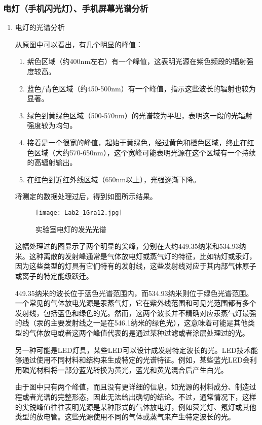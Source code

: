 \documentclass[dvipsnames, svgnames,a4paper,11pt]{article}
\begin{document}
	\subsubsection{电灯（手机闪光灯）、手机屏幕光谱分析}
	\begin{enumerate}
		\item 电灯的光谱分析
		
		从原图中可以看出，有几个明显的峰值：
		
		\begin{enumerate}
			\item 紫色区域（约400nm左右）有一个峰值，这表明光源在紫色频段的辐射强度较高。
			\item 蓝色/青色区域（约450-500nm）有一个峰值，指示这些波长的辐射也较为显著。
			\item 绿色到黄绿色区域（500-570nm）的光谱较为平坦，表明这一段的光辐射强度较为均匀。
			\item 接着是一个很宽的峰值，起始于黄绿色，经过黄色和橙色区域，终止在红色区域（大约570-650nm），这个宽峰可能表明光源在这个区域有一个持续的高辐射输出。
			\item 在红色到近红外线区域（650nm以上），光强逐渐下降。
		\end{enumerate}
		
		将测定的数据处理过后，得到如图所示结果。
		
		\begin{figure}[htbp]
			\centering
			\texttt{[image: Lab2\_1Gra12.jpg]}
			\caption{实验室电灯的发光光谱}
			\label{fig:fig12}
		\end{figure}
		
		这幅处理过的图显示了两个明显的尖峰，分别在大约449.35纳米和534.93纳米。这种离散的发射峰通常是气体放电灯或蒸气灯的特征，比如钠灯或汞灯，因为这些类型的灯具有它们特有的发射线，这些发射线对应于其内部气体原子或离子的特定能级跃迁。
		
		449.35纳米的波长位于蓝色光谱范围内，而534.93纳米则位于绿色光谱范围。一个常见的气体放电光源是汞蒸气灯，它在紫外线范围和可见光范围都有多个发射线，包括蓝色和绿色的光。然而，这两个波长并不精确对应汞蒸气灯最强的线（汞的主要发射线之一是在546.1纳米的绿色光），这意味着可能是其他类型的气体放电或者这两个峰值代表的是通过某种过滤或者涂层处理过的光。
		
		另一种可能是LED灯具，某些LED可以设计成发射特定波长的光。LED技术能够通过使用不同材料和结构来生成特定的光谱特征。例如，某些蓝光LED会利用磷光材料将一部分蓝光转换为黄光，蓝光和黄光混合后产生白光。
		
		由于图中只有两个峰值，而且没有更详细的信息，如光源的材料成分、制造过程或者光谱的完整形态，因此无法给出确切的结论。不过，通常情况下，这样的尖锐峰值往往表明光源是某种形式的气体放电灯，例如荧光灯、氖灯或其他类型的放电管。这些光源使用不同的气体或蒸气来产生特定波长的光。
		

\end{enumerate}
\end{document}
